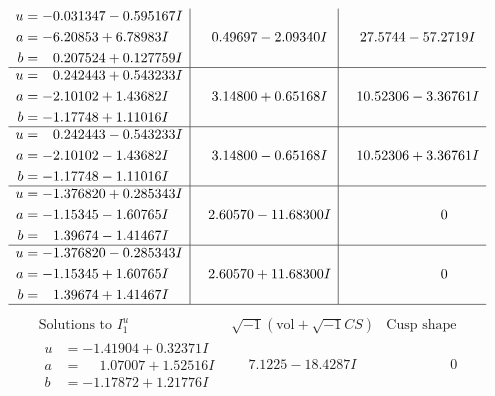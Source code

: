 \documentclass[1p]{elsarticle_modified}
\theoremstyle{definition}
\newcommand{\I}{\sqrt{-1}}
\begin{document}
$$\begin{array}{c|c|c}
\begin{aligned}
u &= -0.031347 - 0.595167 I \\
a &= -6.20853 + 6.78983 I \\
b &= \phantom{-}0.207524 + 0.127759 I\end{aligned}
 & \phantom{-}0.49697 - 2.09340 I & \phantom{-}27.5744 - 57.2719 I \\ \hline\begin{aligned}
u &= \phantom{-}0.242443 + 0.543233 I \\
a &= -2.10102 + 1.43682 I \\
b &= -1.17748 + 1.11016 I\end{aligned}
 & \phantom{-}3.14800 + 0.65168 I & \phantom{-}10.52306 - 3.36761 I \\ \hline\begin{aligned}
u &= \phantom{-}0.242443 - 0.543233 I \\
a &= -2.10102 - 1.43682 I \\
b &= -1.17748 - 1.11016 I\end{aligned}
 & \phantom{-}3.14800 - 0.65168 I & \phantom{-}10.52306 + 3.36761 I \\ \hline\begin{aligned}
u &= -1.376820 + 0.285343 I \\
a &= -1.15345 - 1.60765 I \\
b &= \phantom{-}1.39674 - 1.41467 I\end{aligned}
 & \phantom{-}2.60570 - 11.68300 I & \phantom{-0.000000 } 0 \\ \hline\begin{aligned}
u &= -1.376820 - 0.285343 I \\
a &= -1.15345 + 1.60765 I \\
b &= \phantom{-}1.39674 + 1.41467 I\end{aligned}
 & \phantom{-}2.60570 + 11.68300 I & \phantom{-0.000000 } 0\\
 \hline 
 \end{array}$$\newpage$$\begin{array}{c|c|c}  
\text{Solutions to }I^u_{1}& \I (\text{vol} + \sqrt{-1}CS) & \text{Cusp shape}\\
 \hline 
\begin{aligned}
u &= -1.41904 + 0.32371 I \\
a &= \phantom{-}1.07007 + 1.52516 I \\
b &= -1.17872 + 1.21776 I\end{aligned}
 & \phantom{-}7.1225 - 18.4287 I & \phantom{-0.000000 } 0 \\ \hline\begin{aligned}

\end{aligned}
\end{array}$$
\end{document}

